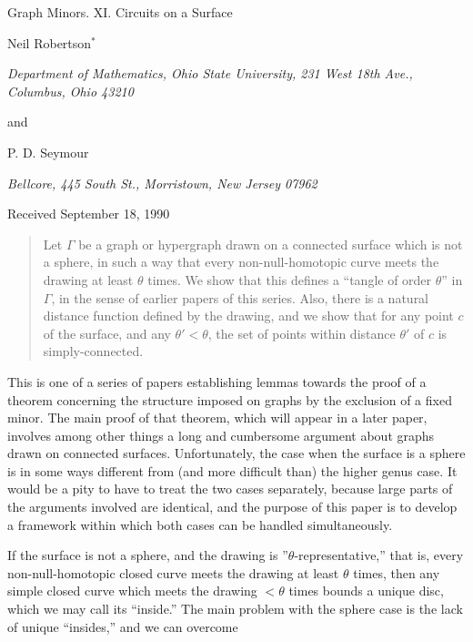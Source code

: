 {\centering
{\Large Graph Minors. XI. Circuits on a Surface\par}\medskip

Neil Robertson$^*$\par
\textit{Department of Mathematics, Ohio State University, 231 West 18th Ave., Columbus, Ohio 43210}\par
and\par
P. D. Seymour\par
\textit{Bellcore, 445 South St., Morristown, New Jersey 07962}\par
Received September 18, 1990\par
}
\begin{quote}
Let $\Gamma$ be a graph or hypergraph drawn on a connected surface which is not a sphere, in such a way that every non-null-homotopic curve meets the drawing at least $\theta$ times. We show that this defines a ``tangle of order $\theta$'' in $\Gamma$, in the sense of earlier papers of this series. Also, there is a natural distance function defined by the drawing, and we show that for any point $c$ of the surface, and any $\theta' < \theta$, the set of points within distance $\theta'$ of $c$ is simply-connected.

\end{quote}


This is one of a series of papers establishing lemmas towards the proof of a theorem concerning the structure imposed on graphs by the exclusion of a fixed minor. The main proof of that theorem, which will appear in a later paper, involves among other things a long and cumbersome argument about graphs drawn on connected surfaces. Unfortunately, the case when the surface is a sphere is in some ways different from (and more difficult than) the higher genus case. It would be a pity to have to treat the two cases separately, because large parts of the arguments involved are identical, and the purpose of this paper is to develop a framework within which both cases can be handled simultaneously.

If the surface is not a sphere, and the drawing is ''$\theta$-representative,'' that is, every non-null-homotopic closed curve meets the drawing at least $\theta$ times, then any simple closed curve which meets the drawing $< \theta$ times bounds a unique disc, which we may call its ``inside.'' The main problem with the sphere case is the lack of unique ``insides,'' and we can overcome%
